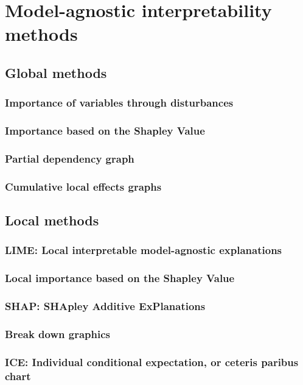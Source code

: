 \chapter{Model-agnostic interpretability methods}

\section{Global methods}

\subsection{Importance of variables through disturbances}
\subsection{Importance based on the Shapley Value}
\subsection{Partial dependency graph}
\subsection{Cumulative local effects graphs}

\section{Local methods}

\subsection{LIME: Local interpretable model-agnostic explanations}
\subsection{Local importance based on the Shapley Value}
\subsection{SHAP: SHApley Additive ExPlanations}
\subsection{Break down graphics}
\subsection{ICE: Individual conditional expectation, or ceteris paribus chart}
